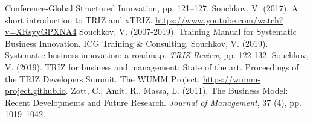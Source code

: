 \documentclass[11pt,a4paper]{article}
\begin{document}
\begin{thebibliography}{xxx}
  Conference-Global Structured Innovation,  pp. 121--127.
 Souchkov, V. (2017). A short introduction to TRIZ and xTRIZ.
  \url{https://www.youtube.com/watch?v=XRsyyGPXNA4}
 Souchkov, V. (2007-2019).  Training Manual for Systematic
  Business Innovation.  ICG Training \& Consulting.
 Souchkov, V. (2019). Systematic business innovation: a roadmap.
  \emph{TRIZ Review}, pp. 122-132.
 Souchkov, V. (2019). TRIZ for business and management: State of
  the art. Proceedings of the TRIZ Developers Summit.
 The WUMM Project. \url{https://wumm-project.github.io}.
 Zott, C., Amit, R., Massa, L. (2011). The Business Model: Recent
  Developments and Future Research. \emph{Journal of Management}, 37 (4),
  pp. 1019–1042.
\end{thebibliography}
\end{document}
